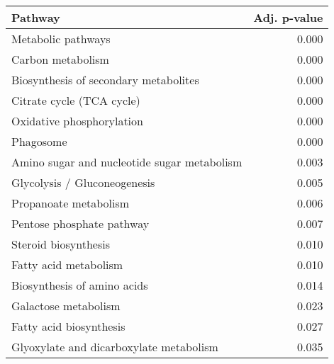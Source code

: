 \begin{tabular}{lr}
\toprule
                                     Pathway &  Adj. p-value \\
\midrule
                          Metabolic pathways &         0.000 \\
                           Carbon metabolism &         0.000 \\
       Biosynthesis of secondary metabolites &         0.000 \\
                   Citrate cycle (TCA cycle) &         0.000 \\
                   Oxidative phosphorylation &         0.000 \\
                                   Phagosome &         0.000 \\
 Amino sugar and nucleotide sugar metabolism &         0.003 \\
                Glycolysis / Gluconeogenesis &         0.005 \\
                       Propanoate metabolism &         0.006 \\
                   Pentose phosphate pathway &         0.007 \\
                        Steroid biosynthesis &         0.010 \\
                       Fatty acid metabolism &         0.010 \\
                 Biosynthesis of amino acids &         0.014 \\
                        Galactose metabolism &         0.023 \\
                     Fatty acid biosynthesis &         0.027 \\
     Glyoxylate and dicarboxylate metabolism &         0.035 \\
\bottomrule
\end{tabular}
